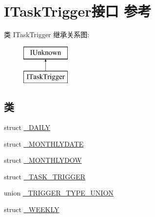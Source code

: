 \hypertarget{interface_i_task_trigger}{}\section{I\+Task\+Trigger接口 参考}
\label{interface_i_task_trigger}
类 I\+Task\+Trigger 继承关系图\+:\begin{figure}[H]
\begin{center}
\leavevmode
\includegraphics[height=2.000000cm]{interface_i_task_trigger}
\end{center}
\end{figure}
\subsection*{类}
\begin{DoxyCompactItemize}
\item 
struct \hyperlink{struct_i_task_trigger_1_1___d_a_i_l_y}{\+\_\+\+D\+A\+I\+LY}
\item 
struct \hyperlink{struct_i_task_trigger_1_1___m_o_n_t_h_l_y_d_a_t_e}{\+\_\+\+M\+O\+N\+T\+H\+L\+Y\+D\+A\+TE}
\item 
struct \hyperlink{struct_i_task_trigger_1_1___m_o_n_t_h_l_y_d_o_w}{\+\_\+\+M\+O\+N\+T\+H\+L\+Y\+D\+OW}
\item 
struct \hyperlink{struct_i_task_trigger_1_1___t_a_s_k___t_r_i_g_g_e_r}{\+\_\+\+T\+A\+S\+K\+\_\+\+T\+R\+I\+G\+G\+ER}
\item 
union \hyperlink{union_i_task_trigger_1_1___t_r_i_g_g_e_r___t_y_p_e___u_n_i_o_n}{\+\_\+\+T\+R\+I\+G\+G\+E\+R\+\_\+\+T\+Y\+P\+E\+\_\+\+U\+N\+I\+ON}
\item 
struct \hyperlink{struct_i_task_trigger_1_1___w_e_e_k_l_y}{\+\_\+\+W\+E\+E\+K\+LY}
\end{DoxyCompactItemize}

